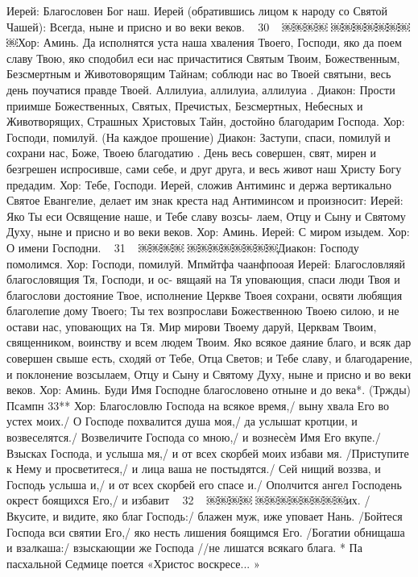 Иерей: Благословен Бог наш.
Иерей (обратившись лицом к народу со Святой Чашей): Всегда, ныне и присно и во веки веков.
~ 30 ~
￼￼￼￼
￼￼￼￼￼￼￼￼Хор: Аминь. Да исполнятся уста наша хваления Твоего, Господи, яко да поем славу Твою, яко сподобил еси нас причаститися Святым Твоим, Божественным, Безсмертным и Животоворящим Тайнам; соблюди нас во Твоей святыни, весь день поучатися правде Твоей. Аллилуиа, аллилуиа, аллилуиа .
Диакон: Прости приимше Божественных, Святых, Пречистых, Безсмертных, Небесных и Животворящих, Страшных Христовых Тайн, достойно благодарим Господа.
Хор: Господи, помилуй. (На каждое прошение)
Диакон: Заступи, спаси, помилуй и сохрани нас, Боже, Твоею благодатию .
День весь совершен, свят, мирен и безгрешен испросивше, сами себе, и друг друга, и весь живот наш Христу Богу предадим.
Хор: Тебе, Господи.
Иерей, сложив Антиминс и держа вертикально Святое Евангелие, делает им знак креста
над Антиминсом и произносит:
Иерей: Яко Ты еси Освящение наше, и Тебе славу возсы- лаем, Отцу и Сыну и Святому Духу, ныне и присно и во веки веков.
Хор: Аминь.
Иерей: С миром изыдем. Хор: О имени Господни.
~ 31 ~
￼￼￼￼
￼￼￼￼￼￼￼￼Диакон: Господу помолимся. Хор: Господи, помилуй.
Мпмйтфа чаанфпооая
Иерей: Благословляяй благословящия Тя, Господи, и ос- вящаяй на Тя уповающия, спаси люди Твоя и благослови достояние Твое, исполнение Церкве Твоея сохрани, освяти любящия благолепие дому Твоего; Ты тех возпрослави Божественною Твоею силою, и не остави нас, уповающих на Тя. Мир мирови Твоему даруй, Церквам Твоим, священником, воинству и всем людем Твоим. Яко всякое даяние благо, и всяк дар совершен свыше есть, сходяй от Тебе, Отца Светов; и Тебе славу, и благодарение, и поклонение возсылаем, Отцу и Сыну и Святому Духу, ныне и присно и во веки веков.
Хор: Аминь. Буди Имя Господне благословено отныне и до века*. (Тржды)
Псампн 33**
Хор: Благословлю Господа на всякое время,/ выну хвала Его во устех моих./ О Господе похвалится душа моя,/ да услышат кротции, и возвеселятся./ Возвеличите Господа со мною,/ и вознесѐм Имя Его вкупе./ Взысках Господа, и услыша мя,/ и от всех скорбей моих избави мя. /Приступите к Нему и просветитеся,/ и лица ваша не постыдятся./ Сей нищий воззва, и Господь услыша и,/ и от всех скорбей его спасе и./ Ополчится ангел Господень окрест боящихся Его,/ и избавит
~ 32 ~
￼￼￼￼
￼￼￼￼￼￼￼￼их. /Вкусите, и видите, яко благ Господь:/ блажен муж, иже уповает Нань. /Бойтеся Господа вси святии Его,/ яко несть лишения боящимся Его. /Богатии обнищаша и взалкаша:/ взыскающии же Господа //не лишатся всякаго блага.
* Па пасхальной Седмице поется «Христос воскресе... »
